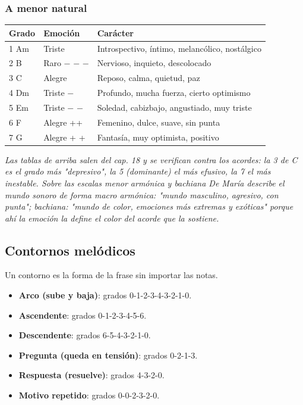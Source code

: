 \documentclass[11pt,a4paper]{article}
\begin{document}
\subsubsection{A menor natural}
\begin{longtable}{p{2.5cm}p{2.7cm}p{9cm}}
\textbf{Grado} & \textbf{Emoci\'on} & \textbf{Car\'acter} \\ \hline
1 \textemdash{} Am & Triste & Introspectivo, íntimo, melancólico, nostálgico \\
2 \textemdash{} B\textdegree{} & Raro \ensuremath{-} \ensuremath{-} \ensuremath{-} & Nervioso, inquieto, descolocado \\
3 \textemdash{} C & Alegre & Reposo, calma, quietud, paz \\
4 \textemdash{} Dm & Triste \ensuremath{-} & Profundo, mucha fuerza, cierto optimismo \\
5 \textemdash{} Em & Triste \ensuremath{-} \ensuremath{-} & Soledad, cabizbajo, angustiado, muy triste \\
6 \textemdash{} F & Alegre ++ & Femenino, dulce, suave, sin punta \\
7 \textemdash{} G & Alegre + + & Fantasía, muy optimista, positivo \\
\end{longtable}
\par \emph{Las tablas de arriba salen del cap. 18 y se verifican contra los acordes: la 3\textordfeminine{} de C es el grado más "depresivo", la 5\textordfeminine{} (dominante) el más efusivo, la 7\textordfeminine{} el más inestable. Sobre las escalas menor armónica y bachiana De María describe el mundo sonoro de forma macro \textemdash{}armónica: "mundo masculino, agresivo, con punta"; bachiana: "mundo de color, emociones más extremas y exóticas"\textemdash{} porque ahí la emoción la define el color del acorde que la sostiene.}
\subsection{Contornos mel\'odicos}
Un contorno es la forma de la frase sin importar las notas.
\begin{itemize}
\item \textbf{Arco (sube y baja)}: grados 0-1-2-3-4-3-2-1-0.
\item \textbf{Ascendente}: grados 0-1-2-3-4-5-6.
\item \textbf{Descendente}: grados 6-5-4-3-2-1-0.
\item \textbf{Pregunta (queda en tensión)}: grados 0-2-1-3.
\item \textbf{Respuesta (resuelve)}: grados 4-3-2-0.
\item \textbf{Motivo repetido}: grados 0-0-2-3-2-0.
\end{itemize}
\end{document}
